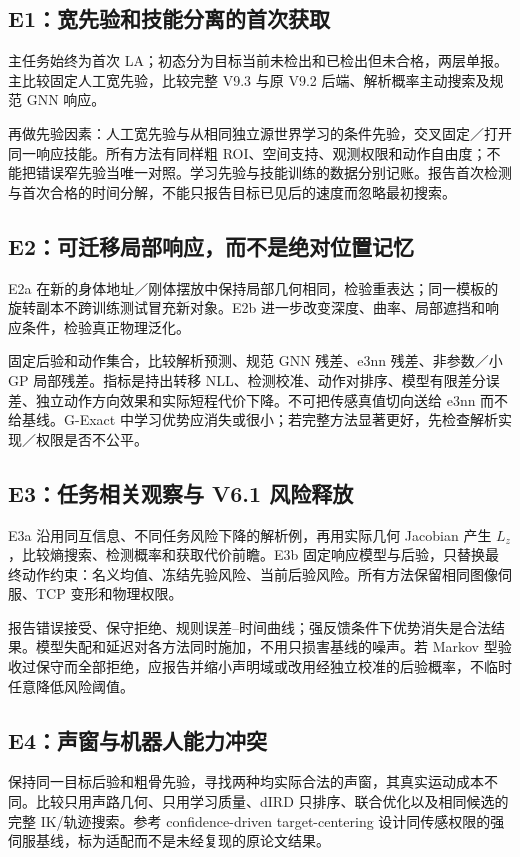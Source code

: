 \documentclass[UTF8,fontset=fandol,11pt,a4paper]{ctexart}
\theoremstyle{plain}
\theoremstyle{definition}
\theoremstyle{remark}
\numberwithin{equation}{section}
\begin{document}
\subsection{E1：宽先验和技能分离的首次获取}
主任务始终为首次 LA；初态分为目标当前未检出和已检出但未合格，两层单报。主比较固定人工宽先验，比较完整 V9.3 与原 V9.2 后端、解析概率主动搜索及规范 GNN 响应。

再做先验因素：人工宽先验与从相同独立源世界学习的条件先验，交叉固定／打开同一响应技能。所有方法有同样粗 ROI、空间支持、观测权限和动作自由度；不能把错误窄先验当唯一对照。学习先验与技能训练的数据分别记账。报告首次检测与首次合格的时间分解，不能只报告目标已见后的速度而忽略最初搜索。

\subsection{E2：可迁移局部响应，而不是绝对位置记忆}
E2a 在新的身体地址／刚体摆放中保持局部几何相同，检验重表达；同一模板的旋转副本不跨训练测试冒充新对象。E2b 进一步改变深度、曲率、局部遮挡和响应条件，检验真正物理泛化。

固定后验和动作集合，比较解析预测、规范 GNN 残差、e3nn 残差、非参数／小 GP 局部残差。指标是持出转移 NLL、检测校准、动作对排序、模型有限差分误差、独立动作方向效果和实际短程代价下降。不可把传感真值切向送给 e3nn 而不给基线。G-Exact 中学习优势应消失或很小；若完整方法显著更好，先检查解析实现／权限是否不公平。

\subsection{E3：任务相关观察与 V6.1 风险释放}
E3a 沿用同互信息、不同任务风险下降的解析例，再用实际几何 Jacobian 产生 $L_z$，比较熵搜索、检测概率和获取代价前瞻。E3b 固定响应模型与后验，只替换最终动作约束：名义均值、冻结先验风险、当前后验风险。所有方法保留相同图像伺服、TCP 变形和物理权限。

报告错误接受、保守拒绝、规则误差--时间曲线；强反馈条件下优势消失是合法结果。模型失配和延迟对各方法同时施加，不用只损害基线的噪声。若 Markov 型验收过保守而全部拒绝，应报告并缩小声明域或改用经独立校准的后验概率，不临时任意降低风险阈值。

\subsection{E4：声窗与机器人能力冲突}
保持同一目标后验和粗骨先验，寻找两种均实际合法的声窗，其真实运动成本不同。比较只用声路几何、只用学习质量、dIRD 只排序、联合优化以及相同候选的完整 IK/轨迹搜索。参考 confidence-driven target-centering 设计同传感权限的强伺服基线\cite{confidence}，标为适配而不是未经复现的原论文结果。
\end{document}
